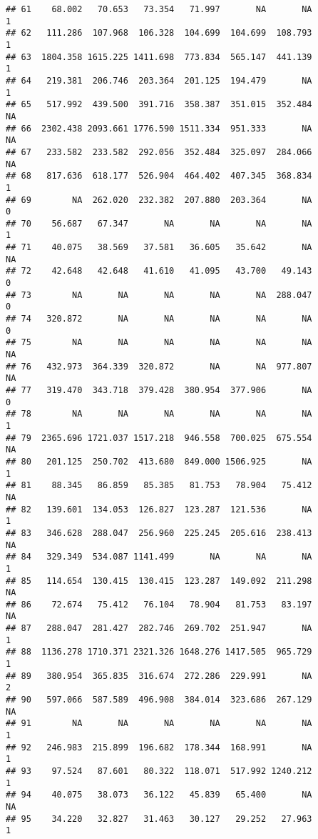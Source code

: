 \documentclass[
]{article}
\begin{document}
\begin{verbatim}
## 61    68.002   70.653   73.354   71.997       NA       NA             1
## 62   111.286  107.968  106.328  104.699  104.699  108.793             1
## 63  1804.358 1615.225 1411.698  773.834  565.147  441.139             1
## 64   219.381  206.746  203.364  201.125  194.479       NA             1
## 65   517.992  439.500  391.716  358.387  351.015  352.484            NA
## 66  2302.438 2093.661 1776.590 1511.334  951.333       NA            NA
## 67   233.582  233.582  292.056  352.484  325.097  284.066            NA
## 68   817.636  618.177  526.904  464.402  407.345  368.834             1
## 69        NA  262.020  232.382  207.880  203.364       NA             0
## 70    56.687   67.347       NA       NA       NA       NA             1
## 71    40.075   38.569   37.581   36.605   35.642       NA            NA
## 72    42.648   42.648   41.610   41.095   43.700   49.143             0
## 73        NA       NA       NA       NA       NA  288.047             0
## 74   320.872       NA       NA       NA       NA       NA             0
## 75        NA       NA       NA       NA       NA       NA            NA
## 76   432.973  364.339  320.872       NA       NA  977.807            NA
## 77   319.470  343.718  379.428  380.954  377.906       NA             0
## 78        NA       NA       NA       NA       NA       NA             1
## 79  2365.696 1721.037 1517.218  946.558  700.025  675.554            NA
## 80   201.125  250.702  413.680  849.000 1506.925       NA             1
## 81    88.345   86.859   85.385   81.753   78.904   75.412            NA
## 82   139.601  134.053  126.827  123.287  121.536       NA             1
## 83   346.628  288.047  256.960  225.245  205.616  238.413            NA
## 84   329.349  534.087 1141.499       NA       NA       NA             1
## 85   114.654  130.415  130.415  123.287  149.092  211.298            NA
## 86    72.674   75.412   76.104   78.904   81.753   83.197            NA
## 87   288.047  281.427  282.746  269.702  251.947       NA             1
## 88  1136.278 1710.371 2321.326 1648.276 1417.505  965.729             1
## 89   380.954  365.835  316.674  272.286  229.991       NA             2
## 90   597.066  587.589  496.908  384.014  323.686  267.129            NA
## 91        NA       NA       NA       NA       NA       NA             1
## 92   246.983  215.899  196.682  178.344  168.991       NA             1
## 93    97.524   87.601   80.322  118.071  517.992 1240.212             1
## 94    40.075   38.073   36.122   45.839   65.400       NA            NA
## 95    34.220   32.827   31.463   30.127   29.252   27.963             1

\end{verbatim}
\end{document}

